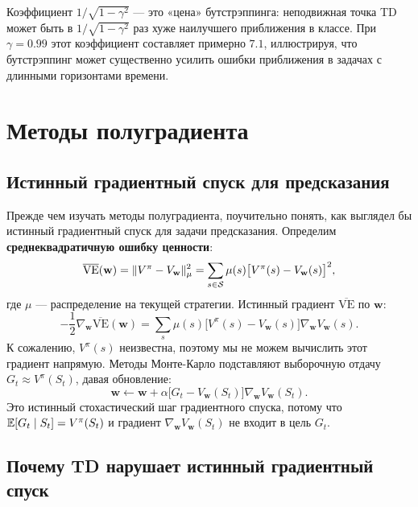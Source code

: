 Коэффициент $1/\sqrt{1-\gamma^2}$ --- это «цена» бутстрэппинга: неподвижная точка TD может быть в $1/\sqrt{1-\gamma^2}$ раз хуже наилучшего приближения в классе.  При $\gamma = 0.99$ этот коэффициент составляет примерно $7.1$, иллюстрируя, что бутстрэппинг может существенно усилить ошибки приближения в задачах с длинными горизонтами времени.

\section{Методы полуградиента}
\label{sec:semi-gradient}

\subsection{Истинный градиентный спуск для предсказания}

Прежде чем изучать методы полуградиента, поучительно понять, как выглядел бы истинный градиентный спуск для задачи предсказания.  Определим \textbf{среднеквадратичную ошибку ценности}:
\begin{equation}
\label{eq:msve}
\overline{\mathrm{VE}}(\mathbf{w})
= \|V^\pi - V_{\mathbf{w}}\|_{\mu}^{2}
= \sum_{s \in \mathcal{S}} \mu(s)\bigl[V^\pi(s) - V_\mathbf{w}(s)\bigr]^2,
\end{equation}
где $\mu$ --- распределение на текущей стратегии.  Истинный градиент $\overline{\mathrm{VE}}$ по $\mathbf{w}$:
\begin{equation}
\label{eq:true-grad-msve}
-\frac{1}{2}\nabla_\mathbf{w}\overline{\mathrm{VE}}(\mathbf{w})
= \sum_s \mu(s)\bigl[V^\pi(s) - V_\mathbf{w}(s)\bigr]\nabla_\mathbf{w} V_\mathbf{w}(s).
\end{equation}
К сожалению, $V^\pi(s)$ неизвестна, поэтому мы не можем вычислить этот градиент напрямую.  Методы Монте-Карло подставляют выборочную отдачу $G_t \approx V^\pi(S_t)$, давая обновление:
\[
\mathbf{w} \leftarrow \mathbf{w} + \alpha\bigl[G_t - V_\mathbf{w}(S_t)\bigr]\nabla_\mathbf{w} V_\mathbf{w}(S_t).
\]
Это истинный стохастический шаг градиентного спуска, потому что $\operatorname{\mathbb{E}}[G_t \mid S_t] = V^\pi(S_t)$ и градиент $\nabla_\mathbf{w} V_\mathbf{w}(S_t)$ не входит в цель $G_t$.

\subsection{Почему TD нарушает истинный градиентный спуск}

